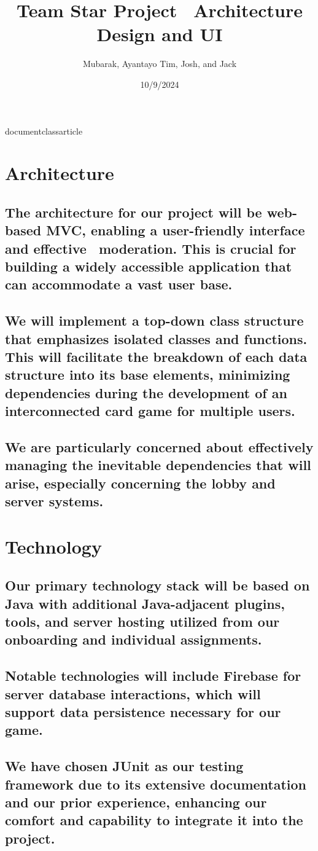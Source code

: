 documentclass{article} \usepackage[utf8]{inputenc} \usepackage{titling} \title{Team Star Project \ \large Architecture Design and UI} \author{Mubarak, Ayantayo Tim, Josh, and Jack} \date{10/9/2024}



\maketitle

\section{Architecture} \subsection{The architecture for our project will be web-based MVC, enabling a user-friendly interface and effective \ moderation. This is crucial for building a widely accessible application that can accommodate a vast user base.} \subsection{We will implement a top-down class structure that emphasizes isolated classes and functions. This will facilitate the breakdown of each data structure into its base elements, minimizing dependencies during the development of an interconnected card game for multiple users.} \subsection{We are particularly concerned about effectively managing the inevitable dependencies that will arise, especially concerning the lobby and server systems.}

\section{Technology} \subsection{Our primary technology stack will be based on Java with additional Java-adjacent plugins, tools, and server hosting utilized from our onboarding and individual assignments.} \subsection{Notable technologies will include Firebase for server database interactions, which will support data persistence necessary for our game.} \subsection{We have chosen JUnit as our testing framework due to its extensive documentation and our prior experience, enhancing our comfort and capability to integrate it into the project.}

